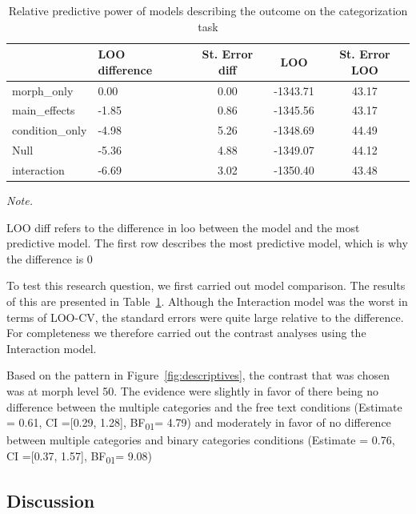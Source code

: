 \documentclass[
  man]{apa7}
\begin{document}
\begin{table}

\caption{\label{tab:rq2-table}Relative predictive power of models describing the outcome on the categorization task}
\centering
\begin{threeparttable}
\begin{tabular}[t]{llccc}
\toprule
  & LOO difference & St. Error diff & LOO & St. Error LOO\\
\midrule
morph\_only & 0.00 & 0.00 & -1343.71 & 43.17\\
main\_effects & -1.85 & 0.86 & -1345.56 & 43.17\\
condition\_only & -4.98 & 5.26 & -1348.69 & 44.49\\
Null & -5.36 & 4.88 & -1349.07 & 44.12\\
interaction & -6.69 & 3.02 & -1350.40 & 43.48\\
\bottomrule
\end{tabular}
\begin{tablenotes}[para]
\item \textit{Note.} 
\item LOO diff refers to the difference in loo between the model and the most predictive model. The first row describes the most predictive model, which is why the difference is 0
\end{tablenotes}
\end{threeparttable}
\end{table}

To test this research question, we first carried out model comparison. The results of this are presented in Table~\ref{tab:rq2-table}. Although the Interaction model was the worst in terms of LOO-CV, the standard errors were quite large relative to the difference. For completeness we therefore carried out the contrast analyses using the Interaction model.

Based on the pattern in Figure~\ref{fig:descriptives}, the contrast that was chosen was at morph level 50. The evidence were slightly in favor of there being no difference between the multiple categories and the free text conditions (Estimate = 0.61, CI ={[}0.29, 1.28{]}, BF\textsubscript{01}= 4.79) and moderately in favor of no difference between multiple categories and binary categories conditions (Estimate = 0.76, CI ={[}0.37, 1.57{]}, BF\textsubscript{01}= 9.08)

\hypertarget{discussion}{%
\subsection{Discussion}\label{discussion}}
\end{document}
